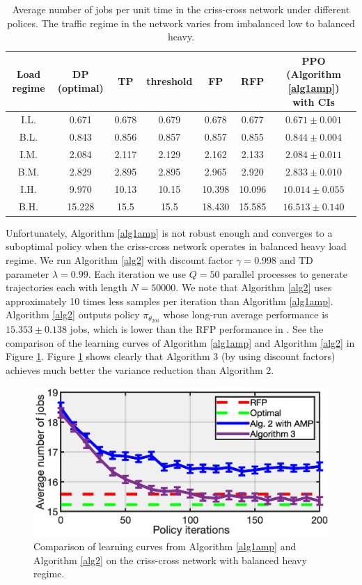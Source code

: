 \documentclass[11pt]{article}
\theoremstyle{definition}
\numberwithin{equation}{section}
\begin{document}
\begin{table}[H]
\centering
\begin{tabular}{|c|c|c|c|c|c|c|}
  \hline
  Load regime  & DP (optimal) & TP & threshold & FP & RFP & PPO (Algorithm \ref{alg1amp}) with CIs\\\hline
  I.L. & 0.671 & 0.678 & 0.679 & 0.678 &0.677&   $0.671\pm 0.001$ \\\hline
  B.L. & 0.843 & 0.856 & 0.857 & 0.857 &0.855&  $0.844\pm 0.004$\\\hline
  I.M. & 2.084 & 2.117 & 2.129 & 2.162 &2.133& $2.084\pm0.011$ \\\hline
  B.M. & 2.829 & 2.895 & 2.895 & 2.965 &2.920 &  $2.833\pm 0.010$\\\hline
  I.H. & 9.970 & 10.13 & 10.15 & 10.398 &10.096 & $10.014\pm0.055$\\\hline
  B.H. & 15.228 & 15.5 & 15.5 & 18.430 &15.585&   $16.513\pm 0.140$ \\

  \hline


\end{tabular}

 \caption[]{Average number of jobs per unit time in the criss-cross network under different polices.
  The traffic regime in the network varies from imbalanced low to balanced heavy.}\label{tab:cc}%
\end{table}


Unfortunately, Algorithm \ref{alg1amp} is not robust enough and converges to a  suboptimal policy when the criss-cross network operates in balanced heavy load regime.
   We run Algorithm \ref{alg2} with discount factor $\gamma=0.998$ and TD parameter $\lambda = 0.99$.
   Each iteration we use $Q = 50$ parallel processes to generate trajectories each with length $N=50000.$
   We note that Algorithm \ref{alg2} uses approximately 10 times less samples per iteration than  Algorithm \ref{alg1amp}. Algorithm \ref{alg2} outputs policy $\pi_{\theta_{200}}$ whose long-run average
   performance is $15.353\pm0.138$ jobs, which is lower than the RFP
     performance in \cite{Bertsimas2015}.  See the comparison of the learning curves of Algorithm \ref{alg1amp} and Algorithm \ref{alg2} in Figure \ref{fig:cc23}.   Figure \ref{fig:cc23} shows clearly that Algorithm 3 (by using discount factors) achieves much better the variance reduction than Algorithm 2.



\begin{figure}[H]
\centering%
\includegraphics[width=.5\linewidth]{DiscVsUndisc}
\caption[]{Comparison of learning curves from Algorithm \ref{alg1amp} and Algorithm \ref{alg2}  on the criss-cross network with balanced heavy regime. }
\label{fig:cc23}%
\end{figure}
\end{document}
